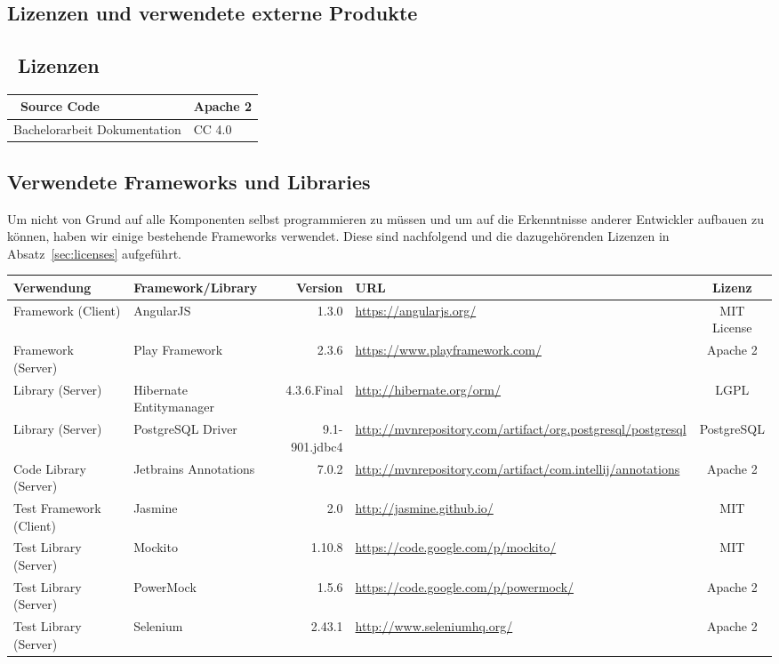 \begin{landscape}
\chapter{Lizenzen und verwendete externe Produkte}
	\section{\eeppi\ Lizenzen}
		\label{sec:eeppiLisences}
	
	\begin{tabularx}{\linewidth}{|l|X|}
		\hline
		\eeppi\ Source Code & Apache 2\\
		\hline
		Bachelorarbeit Dokumentation & CC 4.0\\
		\hline
	\end{tabularx}
	

	\section{Verwendete Frameworks und Libraries}
	\label{sec:usedLibrariesAndFrameworks}
	Um nicht von Grund auf alle Komponenten selbst programmieren zu müssen 
	und um auf die Erkenntnisse anderer Entwickler aufbauen zu können,
	haben wir einige bestehende Frameworks verwendet.
	Diese sind nachfolgend und die dazugehörenden Lizenzen in Absatz~\ref{sec:licenses} aufgeführt.
	
	
	\vspace{0.5cm}
	
	\newcommand{\addLib}[5]{
		#5 & #1 & #2 & \url{#3} & #4 \\
		\hline
	}
	
	
	\begin{tabularx}{\linewidth}{| l | l r | X | c |}
		\hline
		\textbf{Verwendung} & \textbf{Framework/Library} & \textbf{Version} & \textbf{URL} & \textbf{Lizenz} \\
		\hline \hline
		\addLib{AngularJS}{1.3.0}{https://angularjs.org/}{MIT License}{Framework (Client)}
		\addLib{Play Framework}{2.3.6}{https://www.playframework.com/}{Apache 2}{Framework (Server)}
		\addLib{Hibernate Entitymanager}{4.3.6.Final}{http://hibernate.org/orm/}{LGPL}{Library (Server)}
		\addLib{PostgreSQL Driver}{9.1-901.jdbc4}{http://mvnrepository.com/artifact/org.postgresql/postgresql}{PostgreSQL}{Library (Server)}
		\addLib{Jetbrains Annotations}{7.0.2}{http://mvnrepository.com/artifact/com.intellij/annotations}{Apache 2}{Code Library (Server)}
		\addLib{Jasmine}{2.0}{http://jasmine.github.io/}{MIT}{Test Framework (Client)}
		\addLib{Mockito}{1.10.8}{https://code.google.com/p/mockito/}{MIT}{Test Library (Server)}
		\addLib{PowerMock}{1.5.6}{https://code.google.com/p/powermock/}{Apache 2}{Test Library (Server)}
		\addLib{Selenium}{2.43.1}{http://www.seleniumhq.org/}{Apache 2}{Test Library (Server)}
	\end{tabularx}


\end{landscape}
